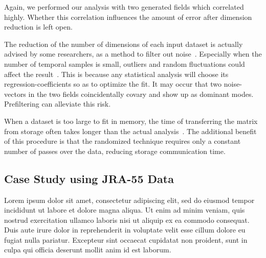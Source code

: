 \documentclass[ijgi,article,submit,moreauthors,pdftex,10pt,a4paper]{Definitions/mdpi}
\begin{document}
Again, we performed our analysis with two generated fields which correlated highly. Whether this correlation influences the amount of error after dimension reduction is left open.

The reduction of the number of dimensions of each input dataset is actually advised by some researchers, as a method to filter out noise~\cite{Barnett1987}. Especially when the number of temporal samples is small, outliers and random fluctuations could affect the result~\cite{Bretherton1992}. This is because any statistical analysis will choose its regression-coefficients so as to optimize the fit. It may occur that two noise-vectors in the two fields coincidentally covary and show up as dominant modes. Prefiltering can alleviate this risk.

When a dataset is too large to fit in memory, the time of transferring the matrix from storage often takes longer than the actual analysis~\cite{Halko2011}. The additional benefit of this procedure is that the randomized technique requires only a constant number of passes over the data, reducing storage communication time.

\subsection{Case Study using JRA-55 Data}
\label{sec:Materials and Methods/Case Study using JRA-55 Data}

Lorem ipsum dolor sit amet, consectetur adipiscing elit, sed do eiusmod tempor incididunt ut labore et dolore magna aliqua. Ut enim ad minim veniam, quis nostrud exercitation ullamco laboris nisi ut aliquip ex ea commodo consequat. Duis aute irure dolor in reprehenderit in voluptate velit esse cillum dolore eu fugiat nulla pariatur. Excepteur sint occaecat cupidatat non proident, sunt in culpa qui officia deserunt mollit anim id est laborum.



\end{document}
